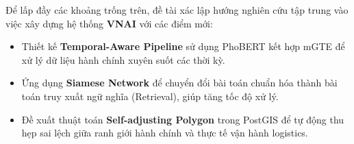 Để lấp đầy các khoảng trống trên, đề tài xác lập hướng nghiên cứu tập trung vào việc xây dựng hệ thống \textbf{VNAI} với các điểm mới:
\begin{itemize}
\item Thiết kế \textbf{Temporal-Aware Pipeline} sử dụng PhoBERT kết hợp mGTE để xử lý dữ liệu hành chính xuyên suốt các thời kỳ.
\item Ứng dụng \textbf{Siamese Network} để chuyển đổi bài toán chuẩn hóa thành bài toán truy xuất ngữ nghĩa (Retrieval), giúp tăng tốc độ xử lý.
\item Đề xuất thuật toán \textbf{Self-adjusting Polygon} trong PostGIS để tự động thu hẹp sai lệch giữa ranh giới hành chính và thực tế vận hành logistics.
\end{itemize}